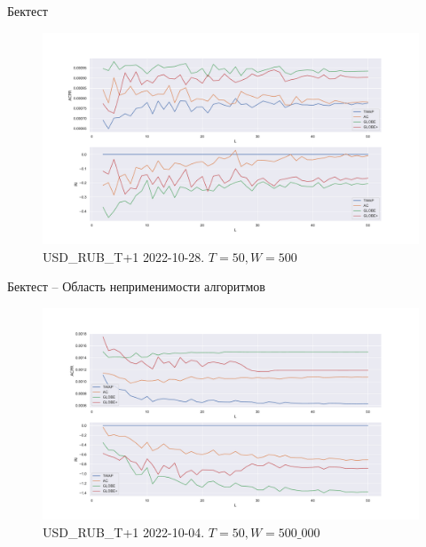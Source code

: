 \documentclass[aspectratio=169]{beamer}
\begin{document}
        \begin{frame}{Бектест}
        
            \begin{figure}  
                \centering
                \includegraphics[width=0.83\linewidth]{USD_RUB_T+1 2022-10-28 T = 50 W = 500}
                \caption{USD\_RUB\_T+1 2022-10-28. $T = 50, W = 500$}
            \end{figure}

        \end{frame}


        \begin{frame}{Бектест -- Область неприменимости алгоритмов}
            \begin{figure}  
                \centering
                \includegraphics[width=0.83\linewidth]{USD_RUB_T+1 2022-10-04 T = 50 W = 500, x10000}
                \caption{USD\_RUB\_T+1 2022-10-04. $T = 50, W = 500\_000$}
            \end{figure}
            
        \end{frame}
\end{document}
